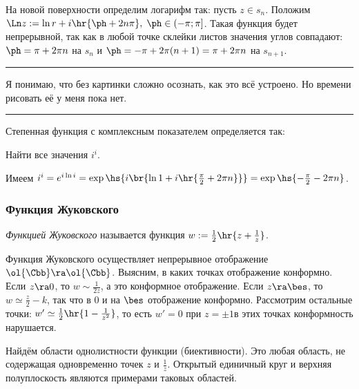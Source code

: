 \documentclass[a4paper]{article}
\newenvironment{petit}
{\par \smallskip \hrule \smallskip \footnotesize}
{\par \smallskip \hrule \smallskip}
\begin{document}
\begin{solution}
На новой поверхности определим логарифм так: пусть $z \in s_n$. Положим
$\Ln z := \ln r + i\hr{\ph + 2n\pi}, \; \ph \in (-\pi; \pi]$. Такая функция будет непрерывной, так как
в любой точке склейки листов значения углов совпадают: $\ph = \pi + 2\pi n$ на $s_n$ и $\ph = - \pi + 2\pi(n + 1) = \pi+ 2\pi n$ на $s_{n+1}$.

\begin{petit}
Я понимаю, что без картинки сложно осознать, как это всё устроено. Но времени рисовать её у меня пока нет.
\end{petit}

\begin{df}
Степенная функция с комплексным показателем определяется так:
\end{df}

\begin{problem}
Найти все значения $i^i$.
\end{problem}
\begin{solution}
Имеем
$i^i = e^{i\ln i} = \exp\hs{i\br{\ln 1 + i\hr{\frac{\pi }{2} + 2\pi n}}} = \exp\hs{-\frac{\pi}{2}-2\pi n}$.
\end{solution}

\subsubsection{Функция Жуковского}

\begin{df}
\emph{Функцией Жуковского} называется функция $w := \frac{1}{2}\hr{z + \frac{1}{z}}$.
\end{df}

Функция Жуковского осуществляет непрерывное отображение $\ol{\Cbb} \ra \ol{\Cbb}$.
Выясним, в каких точках отображение конформно. Если $z \ra 0$, то $w \sim \frac{1}{2z}$, а это конформное отображение.
Если $z \ra \bes$, то $w \simeq \frac{z}{2} - k$, так что в $0$ и на $\bes$ отображение конформно. Рассмотрим
остальные точки: $w' \simeq \frac{1}{2}\hr{1 - \frac{1}{z^2}}$, то есть $w' = 0$ при $z = \pm 1$\т в этих точках конформность
нарушается.

Найдём области однолистности функции (биективности). Это любая область, не содержащая одновременно
точек $z$ и $\frac{1}{z}$. Открытый единичный круг и верхняя полуплоскость являются примерами таковых областей.


\end{solution}
\end{document}
